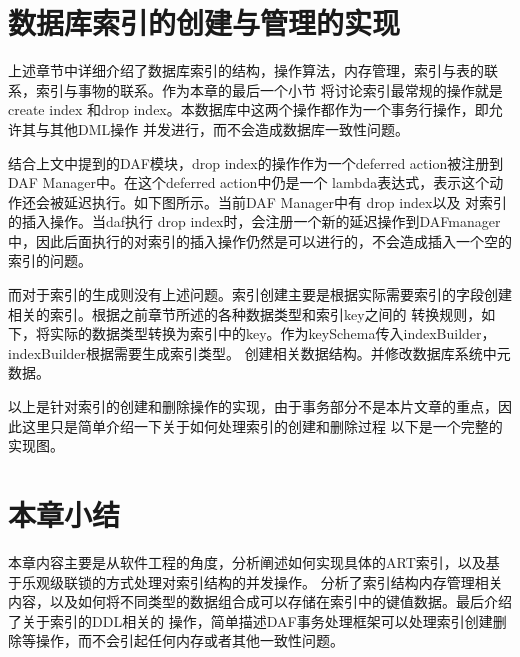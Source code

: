 \section{数据库索引的创建与管理的实现}

上述章节中详细介绍了数据库索引的结构，操作算法，内存管理，索引与表的联系，索引与事物的联系。作为本章的最后一个小节
将讨论索引最常规的操作就是create index 和drop index。本数据库中这两个操作都作为一个事务行操作，即允许其与其他DML操作
并发进行，而不会造成数据库一致性问题。

结合上文中提到的DAF模块，drop index的操作作为一个deferred action被注册到DAF Manager中。在这个deferred action中仍是一个
lambda表达式，表示这个动作还会被延迟执行。如下图所示。当前DAF Manager中有 drop index以及 对索引的插入操作。当daf执行
drop index时，会注册一个新的延迟操作到DAFmanager中，因此后面执行的对索引的插入操作仍然是可以进行的，不会造成插入一个空的
索引的问题。

而对于索引的生成则没有上述问题。索引创建主要是根据实际需要索引的字段创建相关的索引。根据之前章节所述的各种数据类型和索引key之间的
转换规则，如下，将实际的数据类型转换为索引中的key。作为keySchema传入indexBuilder，indexBuilder根据需要生成索引类型。
创建相关数据结构。并修改数据库系统中元数据。

以上是针对索引的创建和删除操作的实现，由于事务部分不是本片文章的重点，因此这里只是简单介绍一下关于如何处理索引的创建和删除过程
以下是一个完整的实现图。


\section{本章小结}

本章内容主要是从软件工程的角度，分析阐述如何实现具体的ART索引，以及基于乐观级联锁的方式处理对索引结构的并发操作。
分析了索引结构内存管理相关内容，以及如何将不同类型的数据组合成可以存储在索引中的键值数据。最后介绍了关于索引的DDL相关的
操作，简单描述DAF事务处理框架可以处理索引创建删除等操作，而不会引起任何内存或者其他一致性问题。